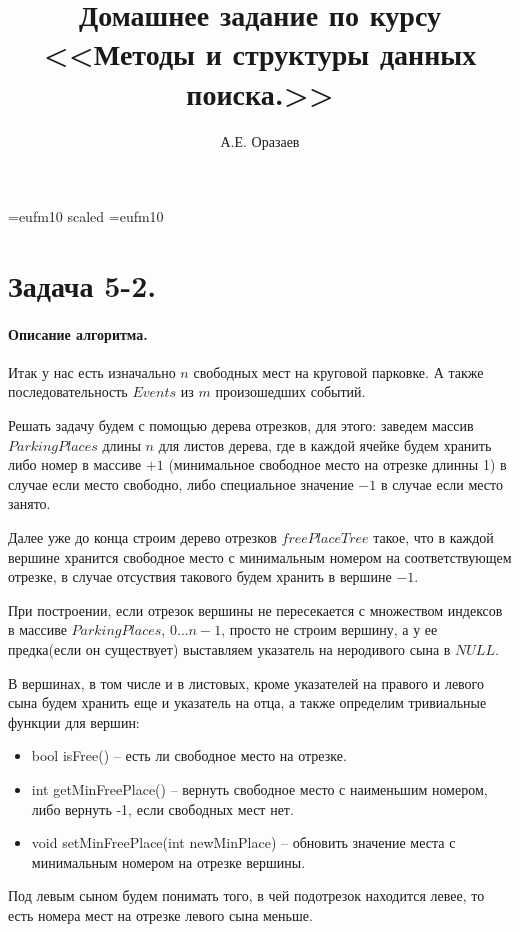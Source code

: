 \documentclass[12pt]{article}
\title{\bf Домашнее задание по курсу \\ <<Методы
и структуры данных поиска.>>}
\author{А.Е. Оразаев}
\date{}
\begin{document}
\voffset=-20mm
\hoffset=-12mm
\font\Got=eufm10 scaled \font\Got=eufm10

\maketitle

\section{Задача 5-2.}
\paragraph{Описание алгоритма.}
Итак у нас есть изначально $ n $ свободных мест на круговой парковке.
А также последовательность $ Events $ из $ m $ произошедших событий.

Решать задачу будем с помощью дерева отрезков, для этого:
заведем массив $ ParkingPlaces $ длины $ n $ для листов дерева, где
в каждой ячейке будем хранить либо номер в массиве $ + 1 $ (минимальное
свободное место на отрезке длинны 1) в случае если место свободно, либо
специальное значение $ -1 $ в случае если место занято.

Далее уже до конца строим дерево отрезков $ freePlaceTree $ такое, что в
каждой вершине хранится свободное место с минимальным номером на
соответствующем отрезке, в случае отсуствия такового будем хранить в
вершине $ -1 $.

При построении, если отрезок вершины не пересекается с множеством
индексов в массиве $ ParkingPlaces $, $ {0 \dots n-1} $, просто не
строим вершину, а у ее предка(если он существует) выставляем указатель
на неродивого сына в $ NULL $.

В вершинах, в том числе и в листовых, кроме указателей на правого и
левого сына будем хранить еще и указатель на отца, а также определим
тривиальные функции для вершин:
\begin{itemize}
    \item bool isFree() -- есть ли свободное место на отрезке.
    \item int getMinFreePlace() -- вернуть свободное место с наименьшим
          номером, либо вернуть -1, если свободных мест нет.
    \item void setMinFreePlace(int newMinPlace) -- обновить значение места
          с минимальным номером на отрезке вершины.
\end{itemize}

Под левым сыном будем понимать того, в чей подотрезок находится левее,
то есть номера мест на отрезке левого сына меньше.
\end{document}
